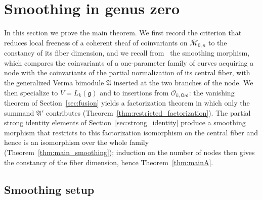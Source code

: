\documentclass[12pt,a4paper,reqno]{amsart}
\numberwithin{equation}{section}
\theoremstyle{definition}
\newcommand{\g}{\mathfrak{g}}
\newcommand{\M}{\mathcal{M}}
\def\O{\mathcal{O}}
\def\Ord{\mathsf{Ord}}
\def\fA{\mathfrak{A}}
\def\A{\mathsf{A}}
\begin{document}






\section{Smoothing in genus zero} \label{sec:smoothing}

In this section we prove the main theorem. We first record the criterion that reduces local freeness of a coherent sheaf of coinvariants on $\overline{\M}_{0,n}$ to the constancy of its fiber dimension, and we recall from~\cite{DGK2} the smoothing morphism, which compares the coinvariants of a one-parameter family of curves acquiring a node with the coinvariants of the partial normalization of its central fiber, with the generalized Verma bimodule $\fA$ inserted at the two branches of the node. We then specialize to $V=L_k(\g)$ and to insertions from $\O_{k,\Ord}$: the vanishing theorem of Section~\ref{sec:fusion} yields a factorization theorem in which only the summand $\fA'$ contributes (Theorem~\ref{thm:restricted_factorization}). The partial strong identity elements of Section~\ref{sec:strong_identity} produce a smoothing morphism that restricts to this factorization isomorphism on the central fiber and hence is an isomorphism over the whole family (Theorem~\ref{thm:main_smoothing}); induction on the number of nodes then gives the constancy of the fiber dimension, hence Theorem~\ref{thm:mainA}.

\subsection{Smoothing setup}
\end{document}
